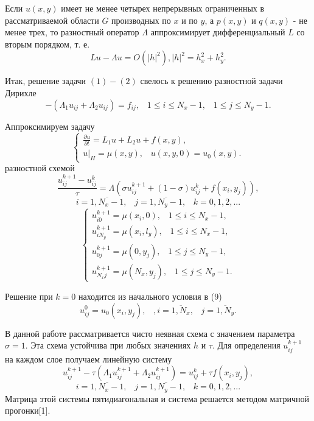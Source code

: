 \documentclass[a4paper, 12pt]{article}
\begin{document}
	Если $u(x, y)$ имеет не менее четырех непрерывных ограниченных в рассматриваемой области $G$ производных по $x$ и по $y$, а $p(x, y)$ и $q(x, y)$ - не менее трех, то разностный оператор $\Lambda$ аппроксимирует дифференциальный $L$ со вторым порядком, т. е.
	$$ Lu - \Lambda u = O(|h|^2), |h|^2 = h^2_x + h^2_y. $$
	
	Итак, решение задачи $(1)-(2)$ свелось к решению разностной задачи Дирихле
	$$ -(\Lambda_1 u_{i j} + \Lambda_2 u_{i j}) = f_{i j}, \;\;\; 1 \le i \le N_x-1, \;\;\; 1 \le j \le N_y-1.$$
	
	Аппроксимируем задачу
	\begin{equation}
		\begin{cases}
			\frac{\partial u}{\partial t} = L_1u + L_2u + f(x, y), \\
			u|_H = \mu(x, y), \;\;\; u(x, y, 0) = u_0(x, y).
		\end{cases}
	\end{equation}
	разностной схемой
	\begin{equation}
		\frac{u^{k+1}_{i j} - u^{k}_{i j}}{\tau} = \Lambda (\sigma u^{k+1}_{i j} + (1 - \sigma)u^{k}_{i j} + f(x_i, y_j)),
	\end{equation}
	$$i = \overline{1, N_x-1}, \;\;\; j = \overline{1, N_y-1}, \;\;\; k = 0, 1, 2, ...$$
	\begin{equation}
		\begin{cases}
			u^{k+1}_{i 0} = \mu(x_i, 0), \;\;\; 1 \le i \le N_x-1, \\
			u^{k+1}_{i N_y} = \mu(x_i, l_y), \;\;\; 1 \le i \le N_x-1, \\
			u^{k+1}_{0 j} = \mu(0, y_j), \;\;\; 1 \le j \le N_y-1, \\
			u^{k+1}_{N_x j} = \mu(N_x, y_j), \;\;\; 1 \le j \le N_y-1.
		\end{cases}
	\end{equation}
	
	Решение при $k = 0$ находится из начального условия в (9)
	$$ u^0_{i j} = u_0 (x_i, y_j), \;\;\;, i = \overline{1, N_x}, \;\;\; j = \overline{1, N_y} .$$
	
	В данной работе рассматривается чисто неявная схема с значением параметра $\sigma = 1$.
	\newline
	Эта схема устойчива при любых значениях $h$ и $\tau$. Для определения $u^{k+1}_{i j}$ на каждом слое получаем линейную систему
	\begin{equation}
		u^{k+1}_{i j} - \tau (\Lambda_1 u^{k+1}_{i j} + \Lambda_2 u^{k+1}_{i j}) = u^{k}_{i j} + \tau f(x_i, y_j),
	\end{equation}
	$$i = \overline{1, N_x-1}, \;\;\; j = \overline{1, N_y-1}, \;\;\; k = 0, 1, 2, ...$$
	Матрица этой системы пятидиагональная и система решается методом матричной прогонки[1].
	\newpage
\end{document}
